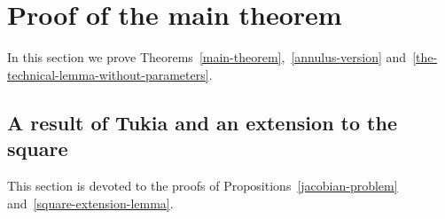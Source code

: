 \documentclass[12pt]{article}
\newtheorem{lemm}[prop]{Lemma}
\theoremstyle{definition}
\begin{document}
%


\section{Proof of the main theorem}
\label{main-section}
In this section we prove Theorems~\ref{main-theorem},~\ref{annulus-version} and~\ref{the-technical-lemma-without-parameters}.

\subsection{A result of Tukia and an extension to the square}
\label{square-extension}
This section is devoted to the proofs of Propositions~\ref{jacobian-problem} and~\ref{square-extension-lemma}.
\end{document}
